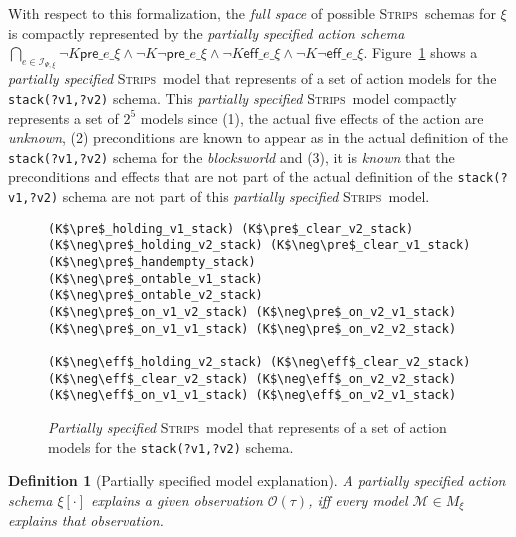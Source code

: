 \documentclass{article}
\newcommand{\pre}{\mathsf{pre}}     %
\newcommand{\eff}{\mathsf{eff}}     %
\newcommand{\strips}{\textsc{Strips}}
\newtheorem{definition}[theorem]{Definition}
\begin{document}
With respect to this formalization, the {\em full space} of possible \strips\ schemas for $\xi$ is compactly represented by the {\em partially specified action schema} {\tt\small $\bigcap_{e\in{\mathcal I}_{\Psi,\xi}} \neg K\pre\_e\_\xi\wedge \neg K\neg\pre\_e\_\xi \wedge\neg K\eff\_e\_\xi\wedge \neg K\neg\eff\_e\_\xi$}. Figure~\ref{fig:partial} shows a {\em partially specified} \strips\ model that represents of a set of action models for the {\tt\small stack(?v1,?v2)} schema. This {\em partially specified} \strips\ model compactly represents a set of $2^5$ models since (1), the actual five effects of the action are {\em unknown}, (2) preconditions are known to appear as in the actual definition of the {\tt\small stack(?v1,?v2)} schema for the {\em blocksworld} and (3), it is {\em known} that the preconditions and effects that are not part of the actual definition of the {\tt\small stack(?v1,?v2)} schema are not part of this {\em partially specified} \strips\ model.

\begin{figure}
  \begin{tiny}  
 \begin{lstlisting}
(K$\pre$_holding_v1_stack) (K$\pre$_clear_v2_stack)
(K$\neg\pre$_holding_v2_stack) (K$\neg\pre$_clear_v1_stack)
(K$\neg\pre$_handempty_stack) 
(K$\neg\pre$_ontable_v1_stack) (K$\neg\pre$_ontable_v2_stack)
(K$\neg\pre$_on_v1_v2_stack) (K$\neg\pre$_on_v2_v1_stack)
(K$\neg\pre$_on_v1_v1_stack) (K$\neg\pre$_on_v2_v2_stack) 

(K$\neg\eff$_holding_v2_stack) (K$\neg\eff$_clear_v2_stack)
(K$\neg\eff$_clear_v2_stack) (K$\neg\eff$_on_v2_v2_stack)
(K$\neg\eff$_on_v1_v1_stack) (K$\neg\eff$_on_v2_v1_stack)
  \end{lstlisting}           
  \end{tiny}  
 \caption{\small {\em Partially specified} \strips\ model that represents of a set of action models for the {\tt\small stack(?v1,?v2)} schema.}
\label{fig:partial}
\end{figure}

\begin{definition}[Partially specified model explanation]
A partially specified action schema $\xi[\cdot]$ {\em explains} a given observation $\mathcal{O}(\tau)$, iff every model $\mathcal{M}\in M_{\xi}$ {\em explains} that observation.
\end{definition}
\end{document}
